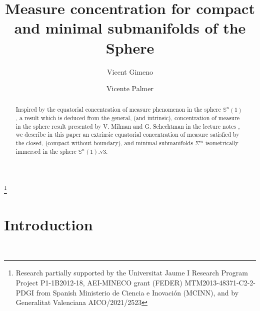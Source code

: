 \documentclass{amsart}
\theoremstyle{definition}
\theoremstyle{remark}
\newcommand{\ese}{\mathbb{S}}
\begin{document}
\title[Measure Concentration]{Measure concentration for compact and minimal submanifolds of the Sphere}





\author{Vicent Gimeno}
\address{Department of Mathematics, Universitat Jaume I-IMAC,   E-12071, 
Castell\'{o}, Spain}
\author{Vicente Palmer}
\address{Department of Mathematics, Universitat Jaume I-INIT,   E-12071, 
Castell\'{o}, Spain}

\thanks{Research partially supported by  the Universitat Jaume I Research Program Project P1-1B2012-18, AEI-MINECO grant (FEDER) MTM2013-48371-C2-2-PDGI from Spanish Ministerio de Ciencia e Inovaci\'{o}n (MCINN), and by Generalitat Valenciana AICO/2021/2523}





\dedicatory{}



\begin{abstract}
Inspired by the equatorial concentration of measure phenomenon in the sphere $\ese^n(1)$, a result which is deduced from the general, (and intrinsic), concentration of measure in the sphere result presented by V. Milman and G. Schechtman in the lecture notes \cite{MS}, we describe in this paper an extrinsic equatorial concentration of measure satisfied by the closed, (compact without boundary), and minimal submanifolds $\Sigma^m$ isometrically immersed in the sphere $\ese^n(1)$.v3.\end{abstract}

\maketitle

\section{Introduction}\label{sec:intro}\
\end{document}

